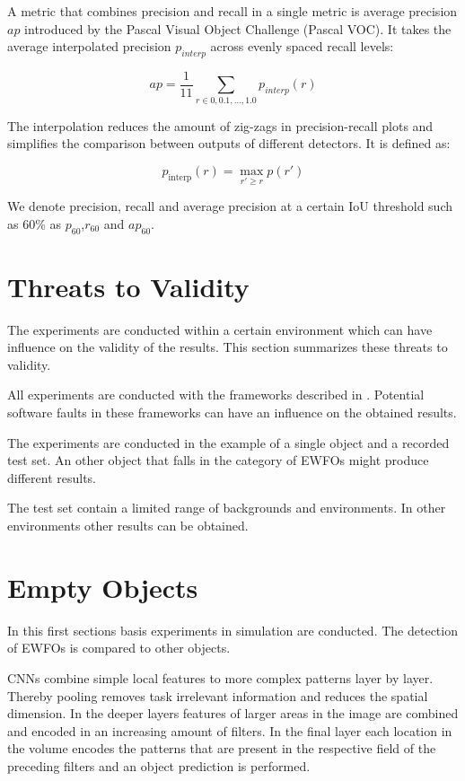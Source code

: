 A metric that combines precision and recall in a single metric is average precision $ap$ introduced by the Pascal Visual Object Challenge (Pascal VOC)\cite{Everingham2010}. It takes the average interpolated precision $p_{interp}$ across evenly spaced recall levels:

$$ ap = \frac{1}{11}\sum_{r \in {0,0.1,...,1.0}}p_{interp}(r)$$

The interpolation reduces the amount of zig-zags in precision-recall plots and simplifies the comparison between outputs of different detectors. It is defined as:

$$ p_\text{interp}(r) = \max\limits_{r' \geq r} p(r')$$

We denote precision, recall and average precision at a certain \ac{IoU} threshold such as 60\% as $p_{60}$,$r_{60}$ and $ap_{60}$.

\section{Threats to Validity}

The experiments are conducted within a certain environment which can have influence on the validity of the results. This section summarizes these threats to validity.

All experiments are conducted with the frameworks described in . Potential software faults in these frameworks can have an influence on the obtained results.

The experiments are conducted in the example of a single object and a recorded test set. An other object that falls in the category of \acp{EWFO} might produce different results.

The test set contain a limited range of backgrounds and environments. In other environments other results can be obtained.

\section{Empty Objects}
\label{sec:empty}

In this first sections basis experiments in simulation are conducted. The detection of \acp{EWFO} is compared to other objects.

\acp{CNN} combine simple local features to more complex patterns layer by layer. Thereby pooling removes task irrelevant information and reduces the spatial dimension. In the deeper layers features of larger areas in the image are combined and encoded in an increasing amount of filters. In the final layer each location in the volume encodes the patterns that are present in the respective field of the preceding filters and an object prediction is performed.

